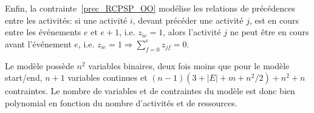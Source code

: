 Enfin, la contrainte~\eqref{prec_RCPSP_OO} modélise les relations
de précédences entre les activités: si une activité $i$, devant
précéder une activité $j$, est en cours entre les événements $e$
et $e+1$, i.e. $z_{ie}=1$, alors l'activité $j$ ne peut être en
cours avant l'événement $e$, i.e. $z_{ie}=1 \Rightarrow
\sum_{f=0}^e z_{jf}=0 $.

Le modèle possède $n^2$ variables binaires, deux fois moins que
pour le modèle start/end, $n+1$ variables continues et
$(n-1)(3+|E|+m+n^2/2)+n^2+n$ contraintes. Le nombre de variables
et de contraintes du modèle est donc bien polynomial en fonction
du nombre d'activités et de ressources.

